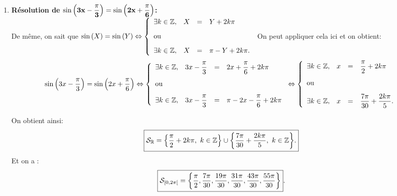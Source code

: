 \documentclass[a4paper, 11pt]{article}
\begin{document}
\begin{correction}
\begin{enumerate}
\begin{minipage}[c]{0.45\textwidth}
\begin{center}
\end{center}
\end{minipage}
\item \textbf{R\'esolution de $\mathbf{\sin{\left(3x-\displaystyle\frac{\pi}{3}\right)}=\sin{\left(2x+\displaystyle\frac{\pi}{6}\right)}}$:}\\
\noindent De m\^{e}me, on sait que $\sin{(X)}=\sin{(Y)}\Leftrightarrow \left\lbrace\begin{array}{llll}  \exists k\in\Z,& X&=& Y+2k\pi\vsec\\ \hbox{ou}\vsec\\ \exists k\in\Z,& X&=& \pi-Y+2k\pi.    \end{array}\right.$ On peut appliquer cela ici et on obtient:
$$\sin{\left(3x-\ddp\frac{\pi}{3}\right)}=\sin{\left(2x+\ddp\frac{\pi}{6}\right)} \Leftrightarrow \left\lbrace\begin{array}{llll}  \exists k\in\Z,& 3x-\ddp\frac{\pi}{3}&=& 2x+\ddp\frac{\pi}{6}+2k\pi\vsec\\ \hbox{ou}\vsec\\ \exists k\in\Z,& 3x-\ddp\frac{\pi}{3}&=&\pi-2x-\ddp\frac{\pi}{6}+2k\pi    \end{array}\right. \Leftrightarrow \left\lbrace\begin{array}{llll}  \exists k\in\Z,& x&=& \ddp\frac{\pi}{2}+2k\pi\vsec\\ \hbox{ou}\vsec\\\exists k\in\Z,& x&=& \ddp\frac{7\pi}{30}+\ddp\frac{2k\pi}{5}.    \end{array}\right.$$
\begin{minipage}[c]{0.45\textwidth}
On obtient ainsi:
$$\fbox{$\mathcal{S}_{\R}=\left\lbrace \ddp\frac{\pi}{2}+2k\pi,\ k\in\Z\right\rbrace\cup\left\lbrace \ddp\frac{7\pi}{30}+\ddp\frac{2k\pi}{5},\ k\in\Z\right\rbrace$.}$$
Et on a :
$$\fbox{$\mathcal{S}_{[0,2\pi[}=\left\{ \displaystyle \frac{\pi}{2}, \frac{7\pi}{30}, \frac{19\pi}{30}, \frac{31\pi}{30}, \frac{43\pi}{30}, \frac{55\pi}{30}\right\}$}.$$
\end{minipage}
\quad \begin{minipage}[c]{0.45\textwidth}

\end{minipage}
\end{enumerate}
\end{correction}
\end{document}
